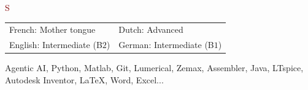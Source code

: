 \documentclass[9pt,a4paper]{article}
\begin{document}
\begin{cv}{}
        
       \begin{cvlist}{\textcolor{Maroon}{S}}\label{Skills} 
			\item[Languages]
							\begin{tabular}{ | p{5cm} | p{5cm} }
							French: Mother tongue & Dutch: Advanced \\
							English: Intermediate (B$2$) & German: Intermediate (B$1$)\\
    						\end{tabular}
           \item[Computer skills] Agentic AI, Python, Matlab, Git, Lumerical, Zemax, Assembler, Java, LTspice, Autodesk Inventor, \LaTeX, Word, Excel...
\end{cvlist}                           
                            

\end{cv}
\end{document}
